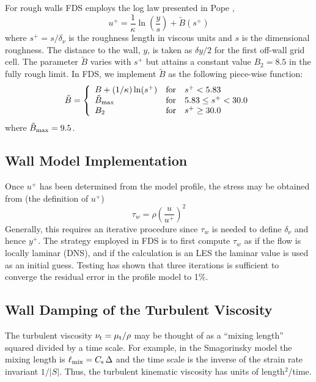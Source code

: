 For rough walls FDS employs the log law presented in Pope \cite{Pope:2000},
\begin{equation}
\label{eqn_roughwallloglaw}
u^+ = \frac{1}{\kappa} \ln \left(\frac{y}{s}\right) + \tilde{B}(s^+)
\end{equation}
where $s^+ = s/\delta_\nu$ is the roughness length in viscous units and $s$ is the dimensional roughness. The distance to the wall, $y$, is taken as $\delta y/2$ for the first off-wall grid cell.  The parameter $\tilde{B}$ varies with $s^+$ but attains a constant value $B_2=8.5$ in the fully rough limit.  In FDS, we implement $\tilde{B}$ as the following piece-wise function:
\begin{equation}
\tilde{B} = \left\{ \begin{array}{lll} B + (1/\kappa)\ln(s^+)  & \mbox{for} &          s^+ < 5.83 \\
                                       \tilde{B}_{\rm max}     & \mbox{for} & 5.83 \le s^+ < 30.0 \\
                                       B_2                     & \mbox{for} &          s^+ \ge 30.0 \end{array} \right.
\end{equation}
where $\tilde{B}_{\rm max} = 9.5$.

\subsection{Wall Model Implementation}
Once $u^+$ has been determined from the model profile, the stress may be obtained from (the definition of $u^+$)
\begin{equation}
\label{eqn_wall_stress}
\tau_w = \rho \left( \frac{u}{u^+} \right)^2
\end{equation}
Generally, this requires an iterative procedure since $\tau_w$ is needed to define $\delta_\nu$ and hence $y^+$.  The strategy employed in FDS is to first compute $\tau_w$ as if the flow is locally laminar (DNS), and if the calculation is an LES the laminar value is used as an initial guess.  Testing has shown that three iterations is sufficient to converge the residual error in the profile model to 1\%.

\subsection{Wall Damping of the Turbulent Viscosity}
\label{sec:wall_damping}

The turbulent viscosity $\nu_{\rm t} = \mu_{\rm t}/\rho$ may be thought of as a ``mixing length'' squared divided by a time scale.  For example, in the Smagorinsky model the mixing length is $\ell_{\rm mix} = C_{\rm s} \,\Delta$ and the time scale is the inverse of the strain rate invariant $1/|S|$.  Thus, the turbulent kinematic viscosity has units of length$^2$/time.

